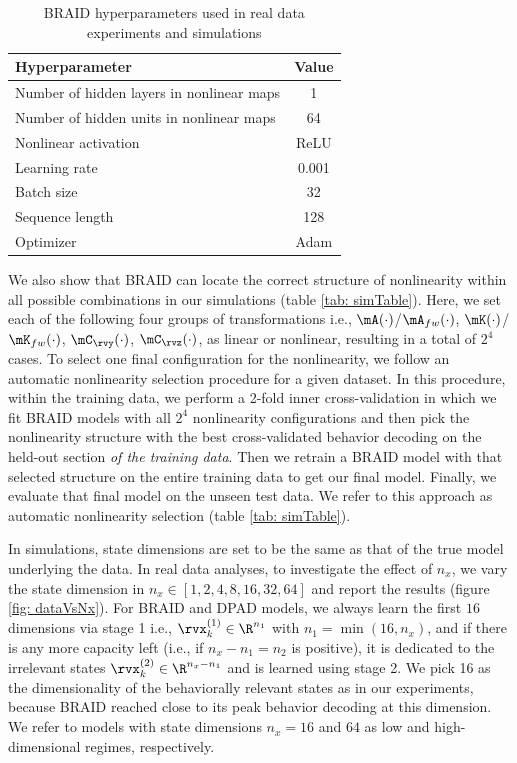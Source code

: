 \documentclass{article} %
\newcommand{\ourmethod}{BRAID}
\begin{document}
\begin{table}[h]
\centering
\caption{\ourmethod{} hyperparameters used in real data experiments and simulations}
\label{tab: hyperparameters}
\begin{tabular}{|l|c|}
\toprule
\textbf{Hyperparameter}    & \textbf{Value}\\
\midrule
Number of hidden layers in nonlinear maps & 1\\
Number of hidden units in nonlinear maps  & 64\\
Nonlinear activation  & ReLU\\
Learning rate              & 0.001\\
Batch size                 & 32\\
Sequence length            & 128\\
Optimizer                  & Adam\\

\bottomrule
\end{tabular}
\end{table}

We also show that \ourmethod{} can locate the correct structure of nonlinearity within all possible combinations in our simulations (table \ref{tab: simTable}). Here, we set each of the following four groups of transformations i.e., \(\mA(\cdot)\)/\(\mA_{fw}(\cdot)\), \(\mK(\cdot)\)/\(\mK_{fw}(\cdot)\), \(\mC_{\rvy}(\cdot)\), \(\mC_{\rvz}(\cdot)\), as linear or nonlinear, resulting in a total of \(2^4\) cases. To select one final configuration for the nonlinearity, we follow an automatic nonlinearity selection procedure for a given dataset. In this procedure, within the training data, we perform a 2-fold inner cross-validation in which we fit \ourmethod{} models with all \(2^4\) nonlinearity configurations and then pick the nonlinearity structure with the best cross-validated behavior decoding on the held-out section \textit{of the training data}. Then we retrain a \ourmethod{} model with that selected structure on the entire training data to get our final model. Finally, we evaluate that final model on the unseen test data. We refer to this approach as automatic nonlinearity selection (table \ref{tab: simTable}).

In simulations, state dimensions are set to be the same as that of the true model underlying the data. In real data analyses, to investigate the effect of \(n_x\), we vary the state dimension in $n_x\in[1,2,4,8,16,32,64]$ and report the results (figure \ref{fig: dataVsNx}). For \ourmethod{} and DPAD models, we always learn the first $16$ dimensions via stage 1 i.e., $\rvx_k^{(1)}\in \R^{n_1}$ with $n_1=\min(16, n_x)$, and if there is any more capacity left (i.e., if $n_x - n_1 = n_2$ is positive), it is dedicated to the irrelevant states $\rvx_k^{(2)}\in \R^{n_x-n_1}$ and is learned using stage 2. We pick 16 as the dimensionality of the behaviorally relevant states as in our experiments, because \ourmethod{} reached close to its peak behavior decoding at this dimension. We refer to models with state dimensions $n_x=16$ and $64$ as low and high-dimensional regimes, respectively.
\end{document}
